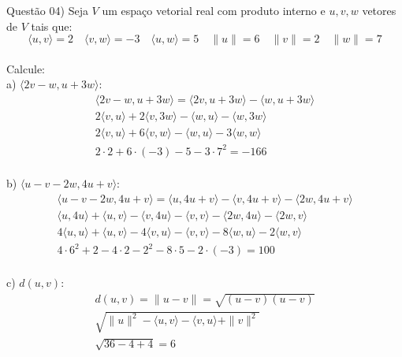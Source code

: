 
\noindent \textcolor{COLOR1}{Questão 04)} Seja $V$ um espaço vetorial real com produto interno e $u, v, w$ vetores de $V$ tais que:
\\


\[
    \langle u,v\rangle=2 \hspace{1em} \langle v,w\rangle=-3 \hspace{1em} \langle u,w\rangle=5 \hspace{1em} \| u\|=6 \hspace{1em} \| v\|=2 \hspace{1em} \| w\|=7
\]
\\

Calcule:
\\

a) $\langle 2v-w,u+3w\rangle$:
\\
\[
    \begin{split}
        \langle 2v-w,u+3w\rangle= \langle 2v,u+3w\rangle - \langle w, u + 3w\rangle\\
        2\langle v,u\rangle + 2\langle v,3w\rangle - \langle w,u\rangle - \langle w,3w\rangle\\
        2\langle v,u\rangle + 6\langle v,w\rangle - \langle w,u\rangle - 3\langle w,w\rangle\\
        2\cdot2 +6\cdot (-3) - 5 - 3\cdot 7^2 = -166
    \end{split}
\]
\\

b) $\langle u - v - 2w, 4u + v\rangle$:
\\
\[
    \begin{split}
        \langle u - v - 2w, 4u + v\rangle = \langle u,4u + v\rangle - \langle v,4u + v\rangle - \langle 2w,4u + v\rangle \\
        \langle u,4u\rangle + \langle u,v\rangle - \langle v,4u\rangle - \langle v,v\rangle - \langle 2w,4u\rangle - \langle 2w,v\rangle\\
        4\langle u,u\rangle + \langle u,v\rangle - 4\langle v,u\rangle - \langle v,v\rangle - 8\langle w,u\rangle - 2\langle w,v\rangle\\
        4\cdot6^2 + 2 - 4\cdot 2 - 2^2 - 8\cdot 5 -2\cdot(-3) = 100
    \end{split}
\]
\\

c) $d(u,v)$:
\\
\[
    \begin{split}
        d(u,v)=\|u-v\| = \sqrt{(u-v)(u-v)}\\
        \sqrt{\|u\|^2 - \langle u,v\rangle -\langle v,u\rangle +\|v\|^2}\\ \sqrt{36-4+4} = 6
    \end{split}
\]
\\

